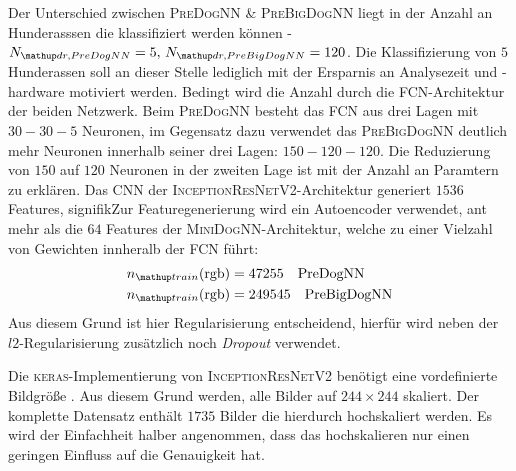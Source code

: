Der Unterschied zwischen \textsc{PreDogNN \& PreBigDogNN} liegt in der Anzahl
an Hunderasssen die klassifiziert werden können -
$N\ua{dr, PreDogNN}=5,\, N\ua{dr, PreBigDogNN}=120$. Die Klassifizierung von $5$ Hunderassen
soll an dieser Stelle lediglich mit der Ersparnis an Analysezeit und -hardware
motiviert werden. Bedingt wird die Anzahl durch die FCN-Architektur der beiden
Netzwerk. Beim \textsc{PreDogNN} besteht das FCN aus drei Lagen mit $30-30-5$
Neuronen, im Gegensatz dazu verwendet das \textsc{PreBigDogNN} deutlich
mehr Neuronen innerhalb seiner drei Lagen: $150-120-120$. Die Reduzierung von
$150$ auf $120$ Neuronen in der zweiten Lage ist mit der Anzahl an Paramtern
zu erklären. Das CNN der \textsc{InceptionResNetV2}-Architektur generiert
$1536$ Features, signifikZur Featuregenerierung wird ein Autoencoder verwendet, ant mehr als die $64$ Features der \textsc{MiniDogNN}-Architektur, welche zu einer Vielzahl von Gewichten innheralb der FCN führt:
\begin{align}
  \begin{aligned}
  \label{eq:ntrain_PreDogNN_PreBigDogNN}
  n\ua{train}(\mathrm{rgb}) &= 47255 \quad \mathrm{PreDogNN} \\
  n\ua{train}(\mathrm{rgb}) &= 249545 \quad \mathrm{PreBigDogNN}
\end{aligned}
\end{align}
Aus diesem Grund ist hier Regularisierung entscheidend, hierfür wird neben der
$l2$-Regularisierung zusätzlich noch \emph{Dropout} verwendet.

Die \textsc{keras}-Implementierung von \textsc{InceptionResNetV2} benötigt
eine vordefinierte Bildgröße \cite{keras_InceptionResNetV2}.
Aus diesem Grund werden, alle Bilder auf $244\times 244$ skaliert.
Der komplette Datensatz enthält $1735$ Bilder die hierdurch hochskaliert werden.
Es wird der Einfachheit halber angenommen, dass das hochskalieren nur einen
geringen Einfluss auf die Genauigkeit hat.

